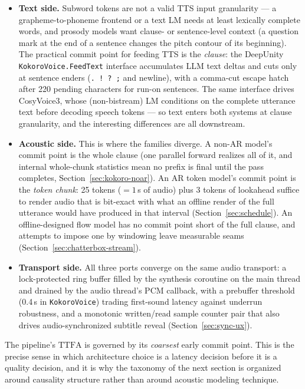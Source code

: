 \documentclass[11pt,a4paper]{article}
\newcommand{\TTFA}{\ensuremath{\mathrm{TTFA}}}
\newcommand{\code}[1]{\texttt{#1}}
\begin{document}
\begin{itemize}[leftmargin=2em]
\item \textbf{Text side.} Subword tokens are not a valid TTS input granularity --- a
grapheme-to-phoneme frontend or a text LM needs at least lexically complete words, and
prosody models want clause- or sentence-level context (a question mark at the end of a
sentence changes the pitch contour of its beginning). The practical commit point for
feeding TTS is the \emph{clause}: the DeepUnity \code{KokoroVoice.FeedText} interface
accumulates LLM text deltas and cuts only at sentence enders (\code{. ! ? ;} and
newline), with a comma-cut escape hatch after 220 pending characters for run-on
sentences. The same interface drives CosyVoice3, whose (non-bistream) LM conditions on
the complete utterance text before decoding speech tokens --- so text enters both systems
at clause granularity, and the interesting differences are all downstream.
\item \textbf{Acoustic side.} This is where the families diverge. A non-AR model's
commit point is the whole clause (one parallel forward realizes all of it, and internal
whole-chunk statistics mean no prefix is final until the pass completes,
Section~\ref{sec:kokoro-noar}). An AR token model's commit point is the \emph{token
chunk}: 25 tokens ($=1$\,s of audio) plus 3 tokens of lookahead suffice to render audio
that is bit-exact with what an offline render of the full utterance would have produced
in that interval (Section~\ref{sec:schedule}). An offline-designed flow model has no
commit point short of the full clause, and attempts to impose one by windowing leave
measurable seams (Section~\ref{sec:chatterbox-stream}).
\item \textbf{Transport side.} All three ports converge on the same audio transport: a
lock-protected ring buffer filled by the synthesis coroutine on the main thread and
drained by the audio thread's PCM callback, with a prebuffer threshold (0.4\,s in
\code{KokoroVoice}) trading first-sound latency against underrun robustness, and a
monotonic written/read sample counter pair that also drives audio-synchronized subtitle
reveal (Section~\ref{sec:sync-ux}).
\end{itemize}

The pipeline's \TTFA{} is governed by its \emph{coarsest} early commit point. This is
the precise sense in which architecture choice is a latency decision before it is a
quality decision, and it is why the taxonomy of the next section is organized around
causality structure rather than around acoustic modeling technique.
\end{document}
